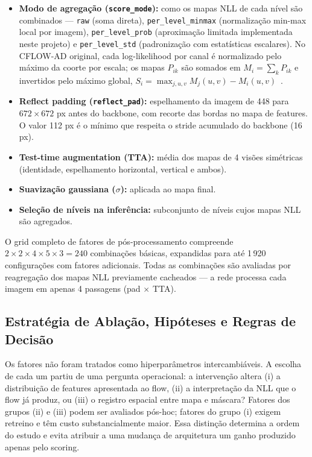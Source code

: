\documentclass[conference]{IEEEtran}
\begin{document}
\begin{itemize}
    \item \textbf{Modo de agregação (\texttt{score\_mode}):} como os mapas NLL de cada nível são combinados --- \texttt{raw} (soma direta), \texttt{per\_level\_minmax} (normalização min-max local por imagem), \texttt{per\_level\_prob} (aproximação limitada implementada neste projeto) e \texttt{per\_level\_std} (padronização com estatísticas escalares). No CFLOW-AD original, cada log-likelihood por canal é normalizado pelo máximo da coorte por escala; os mapas $P_{ik}$ são somados em $M_i=\sum_kP_{ik}$ e invertidos pelo máximo global, $S_i=\max_{j,u,v}M_j(u,v)-M_i(u,v)$~\cite{gudovskiy2022cflow}.
    \item \textbf{Reflect padding (\texttt{reflect\_pad}):} espelhamento da imagem de 448 para $672 \times 672$ px antes do backbone, com recorte das bordas no mapa de features. O valor 112 px é o mínimo que respeita o stride acumulado do backbone (16 px).
    \item \textbf{Test-time augmentation (TTA):} média dos mapas de 4 visões simétricas (identidade, espelhamento horizontal, vertical e ambos).
    \item \textbf{Suavização gaussiana ($\sigma$):} aplicada ao mapa final.
    \item \textbf{Seleção de níveis na inferência:} subconjunto de níveis cujos mapas NLL são agregados.
\end{itemize}

O grid completo de fatores de pós-processamento compreende $2 \times 2 \times 4 \times 5 \times 3 = 240$ combinações básicas, expandidas para até 1\,920 configurações com fatores adicionais. Todas as combinações são avaliadas por reagregação dos mapas NLL previamente cacheados --- a rede processa cada imagem em apenas 4 passagens (pad $\times$ TTA).

\subsection{Estratégia de Ablação, Hipóteses e Regras de Decisão}
\label{sec:ablation_design}

Os fatores não foram tratados como hiperparâmetros intercambiáveis. A escolha de cada um partiu de uma pergunta operacional: a intervenção altera (i) a distribuição de features apresentada ao flow, (ii) a interpretação da NLL que o flow já produz, ou (iii) o registro espacial entre mapa e máscara? Fatores dos grupos (ii) e (iii) podem ser avaliados pós-hoc; fatores do grupo (i) exigem retreino e têm custo substancialmente maior. Essa distinção determina a ordem do estudo e evita atribuir a uma mudança de arquitetura um ganho produzido apenas pelo scoring.
\end{document}
